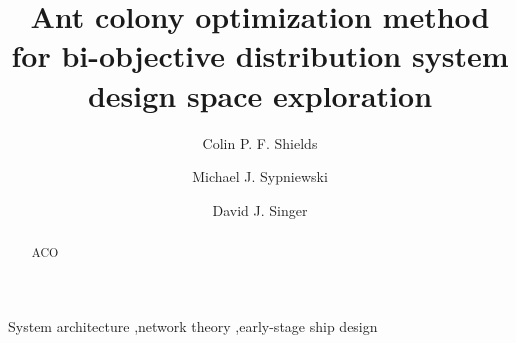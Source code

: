 \documentclass[preprint,12pt]{elsarticle}
\begin{document}
\begin{frontmatter}



\title{Ant colony optimization method for bi-objective distribution system design space exploration}


\author[1]{Colin P. F. Shields}
\author[1]{Michael J. Sypniewski} 
\author[1]{David J. Singer} 
\address[1]{University of Michigan, United States}

\begin{abstract}
ACO

\end{abstract}

\begin{keyword}


System architecture \sep network theory \sep early-stage ship design

\end{keyword}

\end{frontmatter}


\end{document}
